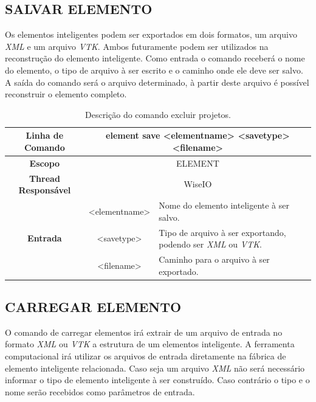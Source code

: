 \documentclass[a4paper,12pt]{monografia}
\theoremstyle{plain}
\theoremstyle{definition}
\theoremstyle{remark}
\begin{document}
\subsection{SALVAR ELEMENTO}\label{sec:save_element}

Os elementos inteligentes podem ser exportados em dois formatos, um arquivo \textit{XML} e um arquivo \textit{VTK}. Ambos futuramente podem ser utilizados na reconstrução do elemento inteligente. Como entrada o comando receberá o nome do elemento, o tipo de arquivo à ser escrito e o caminho onde ele deve ser salvo. A saída do comando será o arquivo determinado, à partir deste arquivo é possível reconstruir o elemento completo.

\begin{center}
\begin{table}[!htbp]
	\begin{tabular}{|c|c|m{}|}
		\hline
		\textbf{Linha de Comando} & \multicolumn{2}{c|}{element save <element\underline{\space\space}name> <save\underline{\space\space}type> <filename>} \\
		\hline
		\textbf{Escopo} & \multicolumn{2}{c|}{ELEMENT} \\
		\hline
		\textbf{Thread Responsável} & \multicolumn{2}{c|}{WiseIO} \\
		\hline
		\multirow{3}{*}{\textbf{Entrada}} & <element\underline{\space\space}name> & Nome do elemento inteligente à ser salvo. \\
		& <save\underline{\space\space}type> & Tipo de arquivo à ser exportando, podendo ser \textit{XML} ou \textit{VTK}. \\
		& <filename> & Caminho para o arquivo à ser exportado. \\
		\hline
	\end{tabular}
	\caption{Descrição do comando excluir projetos.}
	\label{tab:save_element}
\end{table}
\end{center}

\subsection{CARREGAR ELEMENTO}\label{sec:load_element}

O comando de carregar elementos irá extrair de um arquivo de entrada no formato \textit{XML} ou \textit{VTK} a estrutura de um elementos inteligente. A ferramenta computacional irá utilizar os arquivos de entrada diretamente na fábrica de elemento inteligente relacionada. Caso seja um arquivo \textit{XML} não será necessário informar o tipo de elemento inteligente à ser construído. Caso contrário o tipo e o nome serão recebidos como parâmetros de entrada.
\end{document}
